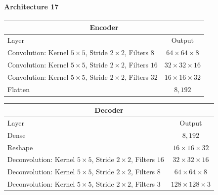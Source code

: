 \paragraph{Architecture 17}

\begin{center}
    \begin{table}[H]
        \centering
        \begin{tabular}{ | l | c | }
            \multicolumn{2}{c}{Encoder} \\ \hline
            Layer & Output\\ \hline
            Convolution: Kernel $5\times5$, Stride $2\times2$, Filters $8  $    & $64\times 64\times 8  $    \\  
            Convolution: Kernel $5\times5$, Stride $2\times2$, Filters $16 $    & $32\times 32\times 16 $    \\
            Convolution: Kernel $5\times5$, Stride $2\times2$, Filters $32 $    & $16\times 16\times 32 $    \\
            Flatten                                                             & $8,192$                    \\
            \hline
        \end{tabular}
    \end{table}
\end{center}
\vspace{-4em}
\begin{center}
    \begin{table}[H]
        \centering
        \begin{tabular}{ | l | c | }
            \multicolumn{2}{c}{Decoder} \\ \hline
            Layer & Output\\ \hline
            Dense                                                                   & $8,192$                   \\
            Reshape                                                                 & $16\times 16\times  32 $  \\
            Deconvolution: Kernel $5\times5$, Stride $2\times2$, Filters $16 $      & $32\times 32\times  16 $  \\
            Deconvolution: Kernel $5\times5$, Stride $2\times2$, Filters $8  $      & $64\times 64\times  8  $  \\
            Deconvolution: Kernel $5\times5$, Stride $2\times2$, Filters $3  $      & $128\times 128\times3  $  \\
            \hline
        \end{tabular} 
    \end{table}
\end{center}

